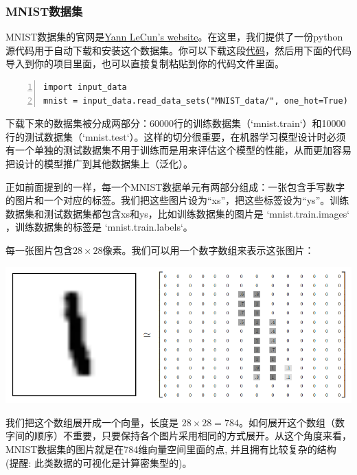 \documentclass[a4paper,11pt,twoside]{ctexart}
\begin{document}
\subsubsection {MNIST数据集}

MNIST数据集的官网是\href{http://yann.lecun.com/exdb/mnist/}{Yann LeCun's website}。在这里，我们提供了一份python源代码用于自动下载和安装这个数据集。你可以下载这段\href{https://tensorflow.googlesource.com/tensorflow/+/master/tensorflow/examples/tutorials/mnist/input_data.py}{代码}，然后用下面的代码导入到你的项目里面，也可以直接复制粘贴到你的代码文件里面。

\begin{colorboxed}
  \begin{lstlisting}[language={[ANSI]Python}, numbers=left,numberstyle=\tiny,
      frame=shadowbox, rulesepcolor=\color{red!20!green!20!blue!20},
      keywordstyle=\color{blue!70!black},
      commentstyle=\color{blue!90!},
      basicstyle=\ttfamily]
import input_data
mnist = input_data.read_data_sets("MNIST_data/", one_hot=True)
  \end{lstlisting}
\end{colorboxed}

下载下来的数据集被分成两部分：60000行的训练数据集（`mnist.train`）和10000行的测试数据集（`mnist.test`）。这样的切分很重要，在机器学习模型设计时必须有一个单独的测试数据集不用于训练而是用来评估这个模型的性能，从而更加容易把设计的模型推广到其他数据集上（泛化）。

正如前面提到的一样，每一个MNIST数据单元有两部分组成：一张包含手写数字的图片和一个对应的标签。我们把这些图片设为“xs”，把这些标签设为“ys”。训练数据集和测试数据集都包含xs和ys，比如训练数据集的图片是 `mnist.train.images` ，训练数据集的标签是 `mnist.train.labels`。

每一张图片包含$ 28 \times 28$像素。我们可以用一个数字数组来表示这张图片：

\includegraphics[width=.85\textwidth]{../SOURCE/images/MNIST-Matrix.png}

我们把这个数组展开成一个向量，长度是 $ 28 \times 28 = 784$。如何展开这个数组（数字间的顺序）不重要，只要保持各个图片采用相同的方式展开。从这个角度来看，MNIST数据集的图片就是在784维向量空间里面的点, 并且拥有比较复杂的结构 (提醒: 此类数据的可视化是计算密集型的)。
\end{document}
